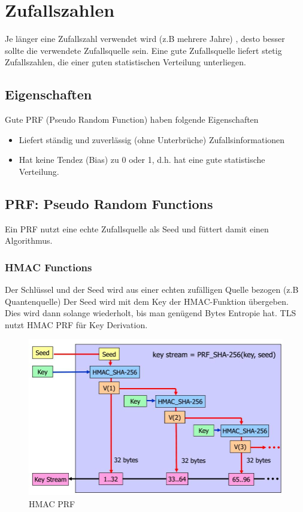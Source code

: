 \section{Zufallszahlen}
Je länger eine Zufallszahl verwendet wird (z.B mehrere Jahre) , desto besser sollte die verwendete Zufallsquelle sein. Eine gute Zufallsquelle liefert stetig Zufallszahlen, die einer guten statistischen Verteilung unterliegen.

\subsection{Eigenschaften}
Gute PRF (Pseudo Random Function) haben folgende Eigenschaften
\begin{itemize}
	\item Liefert ständig und zuverlässig (ohne Unterbrüche) Zufallsinformationen
	\item Hat keine Tendez (Bias) zu 0 oder 1, d.h. hat eine gute statistische Verteilung.
\end{itemize}

\subsection{PRF: Pseudo Random Functions}
Ein PRF nutzt eine echte Zufallsquelle als Seed und füttert damit einen Algorithmus. 

\subsubsection{HMAC Functions}
Der Schlüssel und der Seed wird aus einer echten zufälligen Quelle bezogen (z.B Quantenquelle) Der Seed wird mit dem Key der HMAC-Funktion übergeben. Dies wird dann solange wiederholt, bis man genügend Bytes Entropie hat. TLS nutzt HMAC PRF für Key Derivation.

\begin{figure}[h]
\centering
\includegraphics[width=0.7\linewidth]{images/hmac_prf}
\caption{HMAC PRF}
\label{fig:hmacprf}
\end{figure}


